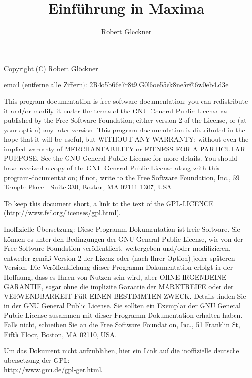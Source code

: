 \documentclass[ngerman,12pt]{scrartcl}
\title{Einführung in Maxima}
\author{Robert Glöckner}
\begin{document}
\maketitle

\tableofcontents

\newpage
\thispagestyle{empty}
Copyright (C) Robert Glöckner

email (entferne alle Ziffern): 2R4o5b66e7r8t9.G0l5oe55ck8ne5r@6w0eb4.d3e

\vspace{1cm}

{\scriptsize
This program-documentation is free software-documentation; you can redistribute it and/or modify it under the terms of the GNU General Public License as published by the Free Software Foundation; either version 2 of the License, or (at your option) any later version.
This program-documentation is distributed in the hope that it will be useful, but WITHOUT ANY WARRANTY; without even the implied warranty of MERCHANTABILITY or FITNESS FOR A PARTICULAR PURPOSE\@. See the GNU General Public License for more details.
You should have received a copy of the GNU General Public License along with this program-documentation; if not, write to the Free Software Foundation, Inc., 59 Temple Place - Suite 330, Boston, MA 02111-1307, USA.

To keep this document short, a link to the text of the GPL-LICENCE (\url{http://www.fsf.org/licenses/gpl.html}).

\vspace{1cm}

Inoffizielle Übersetzung: Diese Programm-Dokumentation ist freie Software. Sie können es unter den Bedingungen der GNU General Public License, wie von der Free Software Foundation veröffentlicht, weitergeben und/oder modifizieren, entweder gemäß Version 2 der Lizenz oder (nach Ihrer Option) jeder späteren Version.
Die Veröffentlichung dieser Programm-Dokumentation erfolgt in der Hoffnung, dass es Ihnen von Nutzen sein wird, aber OHNE IRGENDEINE GARANTIE, sogar ohne die implizite Garantie der MARKTREIFE oder der VERWENDBARKEIT FüR EINEN BESTIMMTEN ZWECK\@. Details finden Sie in der GNU General Public License.
Sie sollten ein Exemplar der GNU General Public License zusammen mit dieser Programm-Dokumentation erhalten haben. Falls nicht, schreiben Sie an die Free Software Foundation, Inc., 51 Franklin St, Fifth Floor, Boston, MA 02110, USA.

Um das Dokument nicht aufzublähen, hier ein Link auf die inoffizielle
deutsche übersetzung der GPL:\\
\url{http://www.gnu.de/gpl-ger.html}.
}
\end{document}
